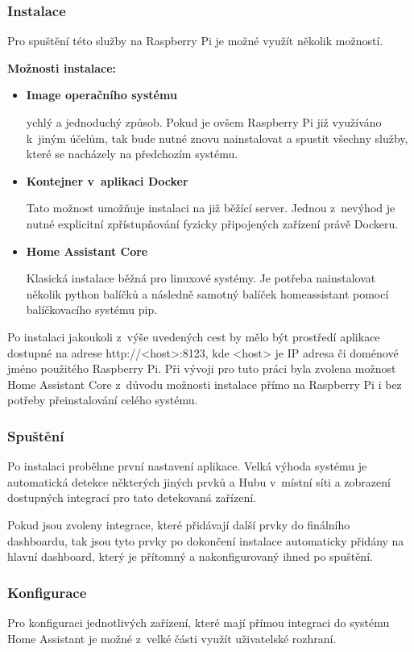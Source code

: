 \subsubsection*{Instalace}
Pro spuštění této služby na Raspberry Pi je možné využít několik možností.

\noindent\textbf{Možnosti instalace\cite{hass-instalation-methods}:}
\begin{itemize}
  \item \textbf{Image operačního systému}
  
  ychlý a jednoduchý způsob. Pokud je ovšem Raspberry Pi již využíváno k~jiným účelům, tak bude nutné znovu nainstalovat a spustit všechny služby, které se nacházely na předchozím systému.
  \item \textbf{Kontejner v~aplikaci Docker}
  
  Tato možnost umožňuje instalaci na již běžící server. Jednou z~nevýhod je nutné explicitní zpřístupňování fyzicky připojených zařízení právě Dockeru.
  \item \textbf{Home Assistant Core}
  
  Klasická instalace běžná pro linuxové systémy. Je potřeba nainstalovat několik python balíčků a následně samotný balíček homeassistant pomocí balíčkovacího systému pip.  
\end{itemize}

Po instalaci jakoukoli z~výše uvedených cest by mělo být prostředí aplikace dostupné na adrese http://<host>:8123, kde <host> je IP adresa či doménové jméno použitého Raspberry Pi.
Při vývoji pro tuto práci byla zvolena možnost Home Assistant Core z~důvodu možnosti instalace přímo na Raspberry Pi i bez potřeby přeinstalování celého systému. 

\subsubsection*{Spuštění}
Po instalaci proběhne první nastavení aplikace. Velká výhoda systému je automatická detekce některých jiných prvků a Hubu v~místní síti a zobrazení dostupných integrací pro tato detekovaná zařízení.

Pokud jsou zvoleny integrace, které přidávají další prvky do finálního dashboardu, tak jsou tyto prvky po dokončení instalace automaticky přidány na hlavní dashboard, který je přítomný a nakonfigurovaný ihned po spuštění.

\subsubsection*{Konfigurace}
Pro konfiguraci jednotlivých zařízení, které mají přímou integraci do systému Home Assistant je možné z~velké části využít uživatelské rozhraní. 

